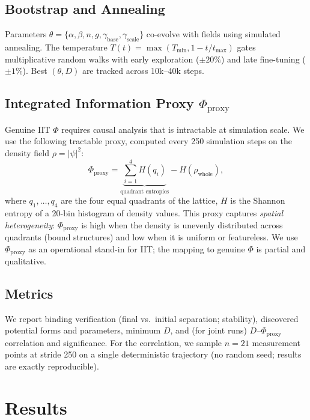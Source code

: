 \documentclass[12pt]{article}
\begin{document}
\subsection{Bootstrap and Annealing}
Parameters $\theta=\{\alpha,\beta,n,g,\gamma_{\mathrm{base}},\gamma_{\mathrm{scale}}\}$ co-evolve with fields using simulated annealing. The temperature $T(t)=\max(T_{\min},1-t/t_{\max})$ gates multiplicative random walks with early exploration (\(\pm20\%\)) and late fine-tuning (\(\pm1\%\)). Best $(\theta,D)$ are tracked across 10k--40k steps.

\subsection{Integrated Information Proxy $\Phi_{\mathrm{proxy}}$}
\label{sec:phi_proxy}
Genuine IIT $\Phi$ requires causal analysis that is intractable at simulation scale. We use the following tractable proxy, computed every 250 simulation steps on the density field $\rho=|\psi|^2$:
\begin{equation}
\Phi_{\mathrm{proxy}} = \underbrace{\sum_{i=1}^{4} H(q_i)}_{\text{quadrant entropies}} - H(\rho_{\mathrm{whole}}),
\end{equation}
where $q_1,\ldots,q_4$ are the four equal quadrants of the lattice, $H$ is the Shannon entropy of a 20-bin histogram of density values. This proxy captures \emph{spatial heterogeneity}: $\Phi_{\mathrm{proxy}}$ is high when the density is unevenly distributed across quadrants (bound structures) and low when it is uniform or featureless. We use $\Phi_{\mathrm{proxy}}$ as an operational stand-in for IIT; the mapping to genuine $\Phi$ is partial and qualitative.

\subsection{Metrics}
We report binding verification (final vs.\ initial separation; stability), discovered potential forms and parameters, minimum $D$, and (for joint runs) $D$--$\Phi_{\mathrm{proxy}}$ correlation and significance. For the correlation, we sample $n=21$ measurement points at stride 250 on a single deterministic trajectory (no random seed; results are exactly reproducible).

\section{Results}\label{sec:results}
\end{document}
